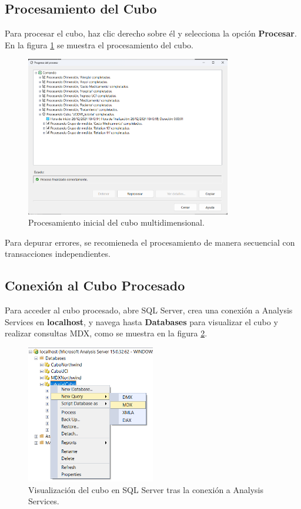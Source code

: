\documentclass{article}
\begin{document}
\subsection{Procesamiento del Cubo}
Para procesar el cubo, haz clic derecho sobre él y selecciona la opción \textbf{Procesar}. En la figura \ref{fig:procesado_completo} se muestra el procesamiento del cubo.

\begin{figure}[H]
	\begin{center}
		\includegraphics[width=0.8\textwidth]{images/procesado_completo.png}
		\caption{Procesamiento inicial del cubo multidimensional.}
		\label{fig:procesado_completo}
	\end{center}
\end{figure}

Para depurar errores, se recomieneda el procesamiento de manera secuencial con transacciones independientes.

\subsection{Conexión al Cubo Procesado}
Para acceder al cubo procesado, abre SQL Server, crea una conexión a Analysis Services en \textbf{localhost}, y navega hasta \textbf{Databases} para visualizar el cubo y realizar consultas MDX, como se muestra en la figura \ref{fig:conexion_cubo}.

\begin{figure}[H]
	\begin{center}
		\includegraphics[width=0.5\textwidth]{images/conexion_cubo.png}
		\caption{Visualización del cubo en SQL Server tras la conexión a Analysis Services.}
		\label{fig:conexion_cubo}
	\end{center}
\end{figure}
\end{document}
